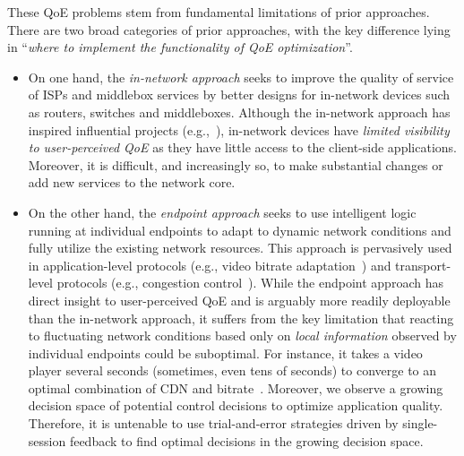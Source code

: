 These QoE problems stem from fundamental limitations of prior approaches. 
There are two broad categories of prior approaches, with the key difference 
lying in ``{\em where to implement the functionality of QoE optimization}''.



\begin{itemize}
\item On one hand, the {\em in-network approach} seeks to improve the 
quality of service of ISPs and middlebox services by better designs 
for in-network devices such as routers, switches and middleboxes.
Although the  in-network approach has inspired influential projects 
(e.g.,~\cite{demers1989analysis,csfq,active-network}),
in-network devices have {\em limited visibility to user-perceived QoE}
as they have little access to the client-side applications.
Moreover, it is difficult, and increasingly so, to make substantial changes 
or add new services to the network core. 

\item On the other hand, the {\em endpoint approach} seeks to use
intelligent logic running at individual endpoints to adapt to dynamic
network conditions and fully utilize the existing network resources.
This approach is pervasively used in application-level protocols (e.g., video 
bitrate adaptation~\cite{dash}) and transport-level protocols (e.g., congestion 
control~\cite{jacobson1988congestion}).
While the endpoint approach has  direct insight to user-perceived QoE and is 
arguably more readily deployable than the in-network approach, 
it suffers from the key limitation that reacting to fluctuating network conditions based 
only on {\em local information} observed by individual endpoints could be suboptimal.
For instance, it takes a video player several seconds (sometimes, even tens of seconds)
to converge to an optimal combination of CDN and 
bitrate~\cite{dda}.
Moreover, we observe a growing decision space of potential control decisions 
to optimize application quality.
Therefore, it is untenable to use trial-and-error strategies driven by 
single-session feedback to find optimal decisions in the growing decision space. 


\end{itemize}
